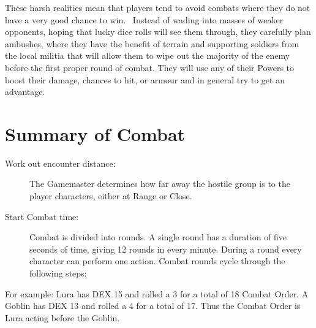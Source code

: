 These harsh realities mean that players tend to avoid combats where they do not have a very good chance to win.  Instead of wading into masses of weaker opponents, hoping that lucky dice rolls will see them through, they carefully plan ambushes, where they have the benefit of terrain and supporting soldiers from the local militia that will allow them to wipe out the majority of the enemy before the first proper round of combat. They will use any of their Powers to boost their damage, chances to hit, or armour and in general try to get an advantage.


\section{Summary of Combat}
\begin{description}
	\item[Work out encounter distance:] The Gamemaster determines how far away the hostile group is to the player characters, either at Range or Close.

	\item[Start Combat time:] Combat is divided into rounds. A single round has a duration of five seconds of time, giving 12 rounds in every minute. During a round every character can perform one action. Combat rounds cycle through the following steps:
\end{description}

\begin{rpg-examplebox}
For example: Lura has DEX 15 and rolled a 3 for a total of 18 Combat Order. A Goblin has DEX 13 and rolled a 4 for a total of 17. Thus the Combat Order is Lura acting before the Goblin.
\end{rpg-examplebox}

